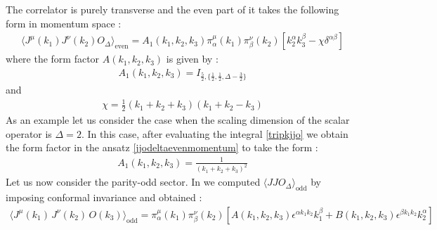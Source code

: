 \documentclass[a4paper,11pt]{article}
\begin{document}
The correlator is purely transverse and the even part of it takes the following form in momentum space \cite{Bzowski:2018fql}:
%
\begin{align}
\label{jjodeltaevenmomentum}
\langle J^\mu(k_1)J^\nu(k_2)O_{\Delta}\rangle_{\text{even}}=A_1(k_1,k_2,k_3)\pi^\mu_{\alpha}(k_1)\pi^\nu_{\beta}(k_2)\left[k_2^{\alpha}k_3^{\beta}-\chi\delta^{\alpha\beta}\right]
\end{align}
where the form factor $A(k_1,k_2,k_3)$ is given by :
\begin{align}
\label{tripkjjo}
A_1(k_1,k_2,k_3)=I_{\frac 52,\{\frac 12,\frac 12,\Delta-\frac 32\}}
\end{align}
%
and
\begin{align}
\label{chidef}
\chi=\frac{1}{2}(k_1+k_2+k_3)(k_1+k_2-k_3)
\end{align}
As an example let us consider the case when the scaling dimension of the scalar operator is $\Delta=2$. In this case, after evaluating the integral \eqref{tripkjjo} we obtain the form factor in the ansatz \eqref{jjodeltaevenmomentum} to take the form :
%
\begin{align}
    A_1(k_1,k_2,k_3)=\frac{1}{(k_1+k_2+k_3)^2}
\end{align}
%
Let us now consider the parity-odd sector. In \cite{Jain:2021qcl} we computed $\langle JJO_{\Delta} \rangle_{\text{odd}}$ by imposing conformal invariance and obtained :
%
\begin{align}
\label{JJOansatz1}
\langle J^\mu(k_1)\,J^\nu(k_2)\,O(k_3)\rangle_{\text{odd}}=\pi^{\mu}_{\alpha}(k_1)\pi^{\nu}_{\beta}(k_2)\left[ A(k_1,k_2,k_3) \epsilon^{\alpha k_1 k_2} k_1^{\beta}+ B(k_1,k_2,k_3) \epsilon^{\beta k_1 k_2}k_2^{\alpha}\right]
\end{align}
\end{document}
